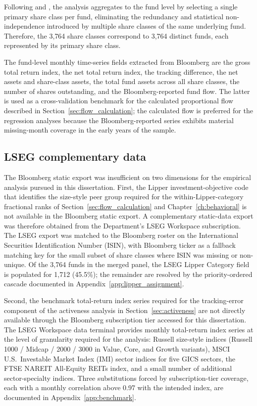 \documentclass[12pt, oneside]{report}
\begin{document}
Following \textcite{KosowskiTimmermannWermersWhite2006} and \textcite{FamaFrench2010}, the
analysis aggregates to the fund level by selecting a single primary
share class per fund, eliminating the redundancy and statistical
non-independence introduced by multiple share classes of the same
underlying fund. Therefore, the 3{,}764 share classes correspond to
3{,}764 distinct funds, each represented by its primary share
class.

The fund-level monthly time-series fields extracted from Bloomberg are
the gross total return index, the net total return index, the tracking
difference, the net assets and share-class assets, the total fund assets
across all share classes, the number of shares outstanding, and the
Bloomberg-reported fund flow. The latter is used as a cross-validation
benchmark for the calculated proportional flow described in
Section~\ref{sec:flow_calculation}; the calculated flow is preferred for
the regression analyses because the Bloomberg-reported series exhibits
material missing-month coverage in the early years of the sample.

\subsection{LSEG complementary data}
\label{sec:lseg_extract}

\noindent The Bloomberg static export was insufficient on two dimensions
for the empirical analysis pursued in this dissertation. First, the
Lipper investment-objective code that identifies the size-style peer
group required for the within-Lipper-category fractional ranks of
Section~\ref{sec:flow_calculation} and Chapter~\ref{ch:behavioral} is not
available in the Bloomberg static export. A complementary static-data export was therefore obtained from
the Department's LSEG Workspace subscription. The LSEG export was
matched to the Bloomberg roster on the International Securities
Identification Number (ISIN), with Bloomberg ticker as a fallback
matching key for the small subset of share classes where ISIN was
missing or non-unique. Of the 3{,}764 funds in the merged panel, the
LSEG Lipper Category field is populated for 1{,}712 (45.5\%);
the remainder are resolved by the priority-ordered cascade documented in
Appendix~\ref{app:lipper_assignment}.

Second, the benchmark total-return index series required for the
tracking-error component of the activeness analysis in
Section~\ref{sec:activeness} are not directly available through the
Bloomberg subscription tier accessed for this dissertation. The LSEG
Workspace data terminal provides monthly total-return index series at
the level of granularity required for the analysis: Russell size-style
indices (Russell 1000 / Midcap / 2000 / 3000 in Value, Core, and Growth
variants), MSCI U.S.\ Investable Market Index (IMI) sector indices
for five GICS sectors, the FTSE NAREIT All-Equity
REITs index, and a small number of additional sector-specialty indices.
Three substitutions forced by subscription-tier coverage, each with a
monthly correlation above 0.97 with the intended index, are documented
in Appendix~\ref{app:benchmark}.
\end{document}
